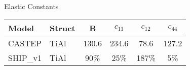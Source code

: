 \documentclass[preview]{standalone}
\begin{document}
    \begin{center}
    \textnormal{Elastic Constants} \\
    \vspace{2mm}
    \begin{tabular}{ l l c c c c } \toprule 
Model & Struct & B & $c_{11}$ & $c_{12}$ & $c_{44}$\\ \midrule 
CASTEP & TiAl & 130.6 & 234.6 & 78.6 & 127.2\\ 
SHIP\_v1 & TiAl & 90\% & 25\% & 187\% & 5\%\\ 
 \bottomrule
    \end{tabular}
    \end{center}
    
\end{document}
